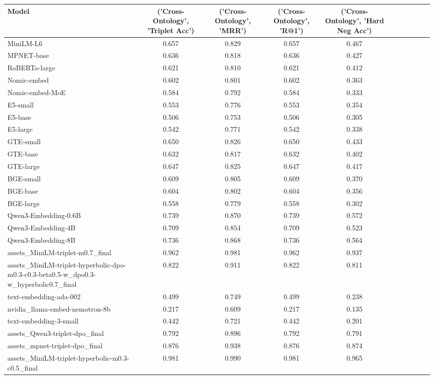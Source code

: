 \begin{tabular}{lcccccccccc}
\toprule
Model & ('Cross-Ontology', 'Triplet Acc') & ('Cross-Ontology', 'MRR') & ('Cross-Ontology', 'R@1') & ('Cross-Ontology', 'Hard Neg Acc') \\
\midrule
MiniLM-L6 & 0.657 & 0.829 & 0.657 & 0.467 \\
MPNET-base & 0.636 & 0.818 & 0.636 & 0.427 \\
RoBERTa-large & 0.621 & 0.810 & 0.621 & 0.412 \\
Nomic-embed & 0.602 & 0.801 & 0.602 & 0.363 \\
Nomic-embed-MoE & 0.584 & 0.792 & 0.584 & 0.333 \\
E5-small & 0.553 & 0.776 & 0.553 & 0.354 \\
E5-base & 0.506 & 0.753 & 0.506 & 0.305 \\
E5-large & 0.542 & 0.771 & 0.542 & 0.338 \\
GTE-small & 0.650 & 0.826 & 0.650 & 0.433 \\
GTE-base & 0.632 & 0.817 & 0.632 & 0.402 \\
GTE-large & 0.647 & 0.825 & 0.647 & 0.417 \\
BGE-small & 0.609 & 0.805 & 0.609 & 0.370 \\
BGE-base & 0.604 & 0.802 & 0.604 & 0.356 \\
BGE-large & 0.558 & 0.779 & 0.558 & 0.302 \\
Qwen3-Embedding-0.6B & 0.739 & 0.870 & 0.739 & 0.572 \\
Qwen3-Embedding-4B & 0.709 & 0.854 & 0.709 & 0.523 \\
Qwen3-Embedding-8B & 0.736 & 0.868 & 0.736 & 0.564 \\
assets_MiniLM-triplet-m0.7_final & 0.962 & 0.981 & 0.962 & 0.937 \\
assets_MiniLM-triplet-hyperbolic-dpo-m0.3-c0.3-beta0.5-w_dpo0.3-w_hyperbolic0.7_final & 0.822 & 0.911 & 0.822 & 0.811 \\
text-embedding-ada-002 & 0.499 & 0.749 & 0.499 & 0.238 \\
nvidia_llama-embed-nemotron-8b & 0.217 & 0.609 & 0.217 & 0.135 \\
text-embedding-3-small & 0.442 & 0.721 & 0.442 & 0.201 \\
assets_Qwen3-triplet-dpo_final & 0.792 & 0.896 & 0.792 & 0.791 \\
assets_mpnet-triplet-dpo_final & 0.876 & 0.938 & 0.876 & 0.874 \\
assets_MiniLM-triplet-hyperbolic-m0.3-c0.5_final & 0.981 & 0.990 & 0.981 & 0.965 \\

\end{tabular}
